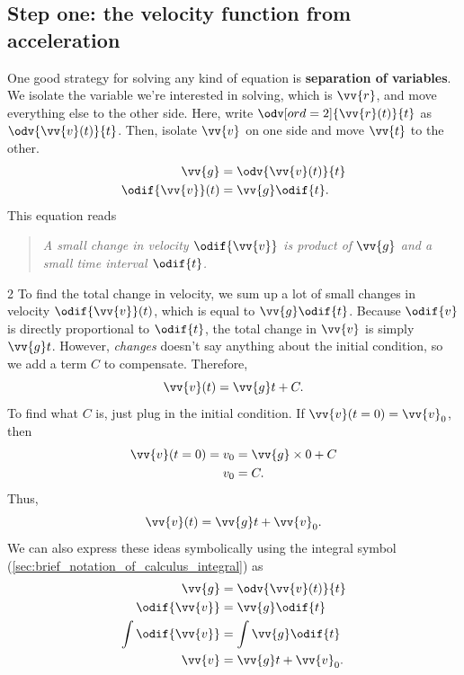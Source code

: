 \subsection{Step one: the velocity function from acceleration}

One good strategy for solving any kind of equation is \textbf{separation of variables}. We isolate the variable we're interested in solving, which is $\vv{r}$, and move everything else to the other side. Here, write $\odv[ord = 2]{\vv{r}(t)}{t}$ as $\odv{\vv{v}(t)}{t}$. Then, isolate $\vv{v}$ on one side and move $\vv{t}$ to the other.
\begin{align}
	\vv{g}           & = \odv{\vv{v}(t)}{t} \\
	\odif{\vv{v}}(t) & = \vv{g}\odif{t}.
\end{align}
This equation reads
\begin{quotation}
	\emph{A small change in velocity $\odif{\vv{v}}$ is product of $\vv{g}$ and a small time interval $\odif{t}$.}
\end{quotation}

\begin{multicols}{2}
	To find the total change in velocity, we sum up a lot of small changes in velocity $\odif{\vv{v}}(t)$, which is equal to $\vv{g}\odif{t}$. Because $\odif{v}$ is directly proportional to $\odif{t}$, the total change in $\vv{v}$ is simply $\vv{g}t$. However, \emph{changes} doesn't say anything about the initial condition, so we add a term $C$ to compensate. Therefore,
	\begin{equation}
		\vv{v}(t) = \vv{g}t + C.
	\end{equation}
	To find what $C$ is, just plug in the initial condition. If $\vv{v}(t = 0) = \vv{v}_0$, then
	\begin{align}
		\vv{v}(t = 0) = v_0 & = \vv{g}\times 0 + C \\
		v_0                 & = C.
	\end{align}
	Thus,
	\begin{equation}
		\vv{v}(t) = \vv{g}t + \vv{v}_0.
	\end{equation}
	We can also express these ideas symbolically using the integral symbol (\cref{sec:brief_notation_of_calculus_integral}) as
	\begin{align}
		\vv{g}            & = \odv{\vv{v}(t)}{t}                           \\
		\odif{\vv{v}}     & = \vv{g}\odif{t}                               \\
		\int\odif{\vv{v}} & = \int \vv{g}\odif{t}                          \\
		\vv{v}            & = \vv{g}t + \vv{v}_0. \label{eq:simplemotionr}
	\end{align}
\end{multicols}


